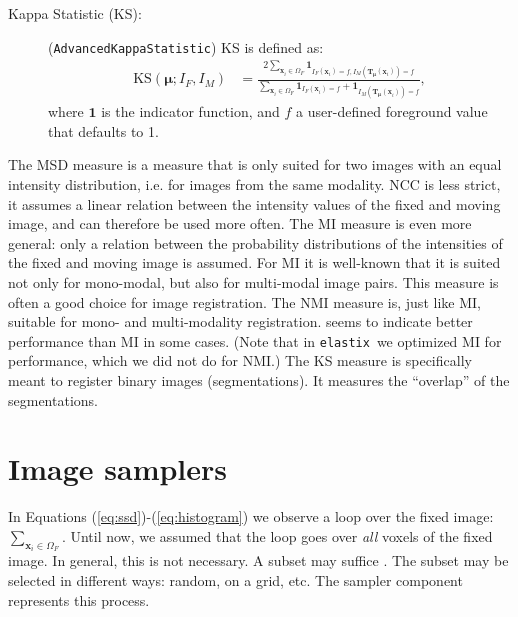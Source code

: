 \documentclass[]{report}
\newcommand{\elastix}{\texttt{elastix}}
\newcommand{\vx}{\bm{x}}
\newcommand{\vmu}{\bm{\mu}}
\newcommand{\vT}{\bm{T}}
\begin{document}
\begin{description}
\item[Kappa Statistic (KS):] (\texttt{AdvancedKappaStatistic})
KS is defined as:
\begin{align}
\mathrm{KS}(\vmu;I_F,I_M) &= \frac{ 2 \sum\limits_{\vx_i \in
\Omega_F} \mathbf{1}_{I_F(\vx_i) = f, I_M(\vT_{\vmu}(\vx_i)) =
f}}{\sum\limits_{\vx_i \in \Omega_F} \mathbf{1}_{I_F(\vx_i) = f} +
\mathbf{1}_{I_M(\vT_{\vmu}(\vx_i)) = f}}, \label{eq:KS}
\end{align}
where $\mathbf{1}$ is the indicator function, and $f$ a user-defined
foreground value that defaults to 1.

\end{description}

The MSD measure is a measure that is only suited for two images with
an equal intensity distribution, i.e. for images from the same
modality. NCC is less strict, it assumes a linear relation between
the intensity values of the fixed and moving image, and can
therefore be used more often. The MI measure is even more general:
only a relation between the probability distributions of the
intensities of the fixed and moving image is assumed. For MI it is
well-known that it is suited not only for mono-modal, but also for
multi-modal image pairs. This measure is often a good choice for
image registration. The NMI measure is, just like MI, suitable for
mono- and multi-modality registration. \cite{Stu99:NMI} seems to
indicate better performance than MI in some cases. (Note that in
\elastix\ we optimized MI for performance, which we did not do for
NMI.) The KS measure is specifically meant to register binary images
(segmentations). It measures the ``overlap'' of the segmentations.

\section{Image samplers}\label{sec:comp:sampler}

In Equations (\ref{eq:ssd})-(\ref{eq:histogram}) we observe a loop
over the fixed image: $\sum_{\vx_i \in \Omega_F}$. Until now, we
assumed that the loop goes over \emph{all} voxels of the fixed
image. In general, this is not necessary. A subset may suffice
\citep{ThevenazEA00a,KleinEA07}. The subset may be selected in
different ways: random, on a grid, etc. The sampler component
represents this process.
\end{document}
